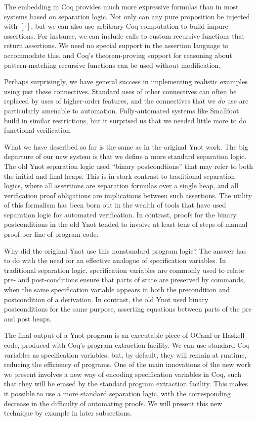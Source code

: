 \documentclass[preprint,nocopyrightspace]{sigplanconf}
\begin{document}
The embedding in Coq provides much more expressive formulas than in most systems based on separation logic.  Not only can any pure proposition be injected with $[\cdot]$, but we can also use arbitrary Coq computation to build impure assertions.  For instance, we can include calls to custom recursive functions that return assertions.  We need no special support in the assertion language to accommodate this, and Coq's theorem-proving support for reasoning about pattern-matching recursive functions can be used without modification.

Perhaps surprisingly, we have general success in implementing realistic examples using just these connectives.  Standard uses of other connectives can often be replaced by uses of higher-order features, and the connectives that we \emph{do} use are particularly amenable to automation.  Fully-automated systems like Smallfoot build in similar restrictions, but it surprised us that we needed little more to do functional verification.

\medskip

What we have described so far is the same as in the original Ynot
work.  The big departure of our new system is that we define a more
standard separation logic.  The old Ynot separation logic used
``binary postcondtions'' that may refer to both the initial and final
heaps.  This is in stark contrast to traditional separation logics,
where all assertions are separation formulas over a single heap, and all verification proof obligations are implications between such assertions.  The utility of this formalism has been born out in the wealth of tools that have used separation logic for automated verification.  In contrast, proofs for the binary postconditions in the old Ynot tended to involve at least tens of steps of manual proof per line of program code.

Why did the original Ynot use this nonstandard program logic?  The answer has to do with the need for an effective analogue of specification variables.  In traditional separation logic, specification variables are commonly used to relate pre- and post-conditions ensure that parts of state are preserved by commands, when the same specification variable appears in both the precondition and postcondition of a derivation.  In contrast, the old Ynot used binary postconditions for the same purpose, asserting equations between parts of the pre and post heaps.

The final output of a Ynot program is an executable piece of OCaml or Haskell code, produced with Coq's program extraction facility.  We can use standard Coq variables as specification variables, but, by default, they will remain at runtime, reducing the efficiency of programs.  One of the main innovations of the new work we present involves a new way of encoding specification variables in Coq, such that they will be erased by the standard program extraction facility.  This makes it possible to use a more standard separation logic, with the corresponding decrease in the difficulty of automating proofs.  We will present this new technique by example in later subsections.
\end{document}
